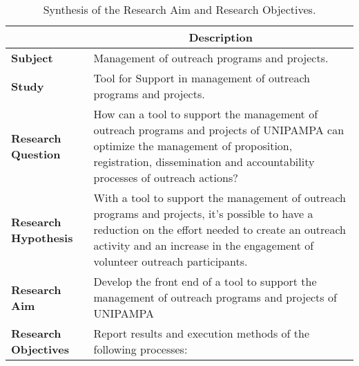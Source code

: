 \begin{table}[!htb]
  \centering
  \caption{Synthesis of the Research Aim and Research Objectives.}
  \label{tbl:intro-objectives}
  \footnotesize
  \begin{tabular}{l|p{11cm}}
    \bottomrule
    \rowcolor[rgb]{0.749,0.749,0.749} \multicolumn{1}{c|}{\textbf{Topic}}                  & \multicolumn{1}{c}{\textbf{Description}}                                                                                                                                                                                             \\
    \hline
    \rowcolor[rgb]{0.898,0.898,0.898} \textcolor[rgb]{0.145,0.145,0.145}{\textbf{Subject}} & Management of outreach programs and projects.                                                                                                                                                                                        \\
    \textbf{Study}                                                                         & Tool for Support in management of outreach programs and projects.                                                                                                                                                                    \\
    \rowcolor[rgb]{0.898,0.898,0.898} \textbf{Research Question}                           & How can a tool to support the management of outreach programs and projects of \acs{UNIPAMPA} can optimize the management of proposition, registration, dissemination and accountability processes of outreach actions?               \\
    \textcolor[rgb]{0.145,0.145,0.145}{\textbf{Research Hypothesis}}                       & With a tool to support the management of outreach programs and projects, it's possible to have a reduction on the effort needed to create an outreach activity and an increase in the engagement of volunteer outreach participants. \\
    \rowcolor[rgb]{0.898,0.898,0.898} \textbf{Research Aim}                                & Develop the front end of a tool to support the management of outreach programs and projects of \acs{UNIPAMPA}                                                                                                                        \\
    \textbf{Research Objectives}                                                           & Report results and execution methods of the following processes:

\end{tabular}
\end{table}
